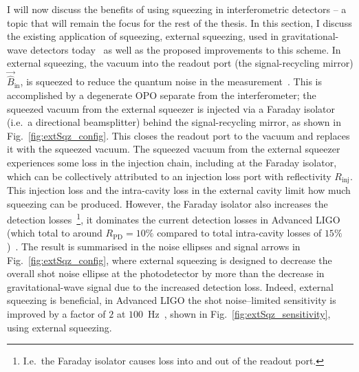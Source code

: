 I will now discuss the benefits of using squeezing in interferometric detectors -- a topic that will remain the focus for the rest of the thesis. In this section, I discuss the existing application of squeezing, external squeezing, used in gravitational-wave detectors today~\cite{} as well as the proposed improvements to this scheme. 
In external squeezing, the vacuum into the readout port (the signal-recycling mirror) $\vec{\hat B}_\text{in}$, is squeezed to reduce the quantum noise in the measurement~\cite{}. This is accomplished by a degenerate OPO separate from the interferometer; the squeezed vacuum from the external squeezer is injected via a Faraday isolator~\cite{} (i.e.\ a directional beamsplitter) behind the signal-recycling mirror, as shown in Fig.~\ref{fig:extSqz_config}. This closes the readout port to the vacuum and replaces it with the squeezed vacuum. The squeezed vacuum from the external squeezer experiences some loss in the injection chain, including  at the Faraday isolator, which can be collectively attributed to an injection loss port with reflectivity $R_\text{inj}$. This injection loss and the intra-cavity loss in the external cavity limit how much squeezing can be produced. However, the Faraday isolator also increases the detection losses~\footnote{I.e.\ the Faraday isolator causes loss into and out of the readout port.}, it dominates the current detection losses in Advanced LIGO (which total to around $R_\text{PD}=10\%$ compared to total intra-cavity losses of $15\%$ )~\cite{}. The result is summarised in the noise ellipses and signal arrows in Fig.~\ref{fig:extSqz_config}, where external squeezing is designed to decrease the overall shot noise ellipse at the photodetector by more than the decrease in gravitational-wave signal due to the increased detection loss. Indeed, external squeezing is beneficial, in Advanced LIGO the shot noise--limited sensitivity is improved by a factor of $2$ at $100$~Hz~\cite{tseQuantumEnhancedAdvancedLIGO2019}, shown in Fig.~\ref{fig:extSqz_sensitivity}, using external squeezing.  

